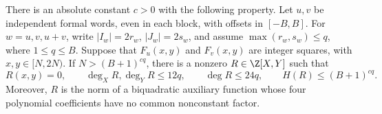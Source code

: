 \begin{proposition}
\label{p13:rig:two-witnesses}
There is an absolute constant $c>0$ with the following property.
Let $u,v$ be independent formal words, even in each block,
with offsets in $[-B,B]$.  For $w=u,v,u+v$, write
$|I_w|=2r_w$, $|J_w|=2s_w$, and assume
$\max(r_w,s_w)\le q$, where $1\le q\le B$.
Suppose that $F_u(x,y)$ and $F_v(x,y)$ are integer squares,
with $x,y\in[N,2N)$.  If $N>(B+1)^{cq}$, there is a
nonzero $R\in\Z[X,Y]$ such that
\begin{equation}
 R(x,y)=0,\qquad
 \deg_XR,\deg_YR\le12q,\qquad \deg R\le24q,
 \qquad H(R)\le(B+1)^{cq}.
 \label{p13:rig:two-polynomial}
\end{equation}
Moreover, $R$ is the norm of a biquadratic auxiliary function
whose four polynomial coefficients have no common nonconstant
factor.
\end{proposition}


